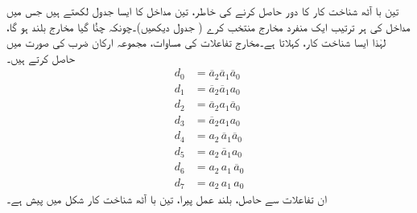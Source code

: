 تین با آٹھ  شناخت کار کا دور حاصل کرنے کی خاطر، تین مداخل کا ایسا جدول لکھتے ہیں جس میں مداخل کی ہر ترتیب ایک منفرد مخارج
 منتخب کرے ( جدول  دیکھیں)۔چونکہ چنُا گیا مخارج بلند ہو گا، لہٰذا ایسا شناخت کار،  کہلاتا ہے۔مخارج تفاعلات کی مساوات، مجموعہ ارکان ضرب کی صورت میں حاصل کرتے ہیں۔
\begin{align*}
d_0&=\overline{a}_2 \overline{a}_1 \overline{a}_0\\
d_1&=\overline{a}_2 \overline{a}_1 a_0\\
d_2&=\overline{a}_2 a_1 \overline{a}_0\\
d_3&=\overline{a}_2 a_1 a_0\\
d_4&=a_2\, \overline{a}_1 \overline{a}_0\\
d_5&=a_2\, \overline{a}_1 a_0\\
d_6&=a_2\, a_1\, \overline{a}_0\\
d_7&=a_2\, a_1\, a_0
\end{align*}
ان تفاعلات سے حاصل، بلند عمل پیرا، تین با آٹھ  شناخت کار شکل  میں پیش ہے۔
